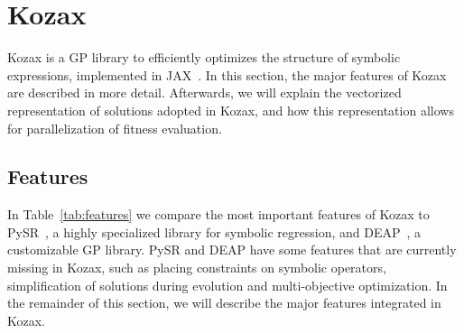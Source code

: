 \documentclass{article}
\begin{document}
\section{Kozax}
Kozax is a GP library to efficiently optimizes the structure of symbolic expressions, implemented in JAX~\cite{jax2018github}. In this section, the major features of Kozax are described in more detail. Afterwards, we will explain the vectorized representation of solutions adopted in Kozax, and how this representation allows for parallelization of fitness evaluation.


\subsection{Features}
In Table~\ref{tab:features} we compare the most important features of Kozax to PySR~\cite{cranmer2023interpretable}, a highly specialized library for symbolic regression, and DEAP~\cite{fortin2012deap}, a customizable GP library. PySR and DEAP have some features that are currently missing in Kozax, such as placing constraints on symbolic operators, simplification of solutions during evolution and multi-objective optimization. In the remainder of this section, we will describe the major features integrated in Kozax.
\end{document}
